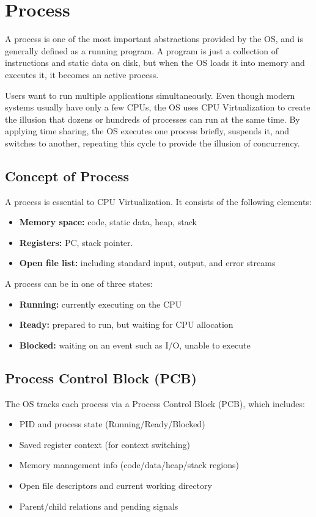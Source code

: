 
\section{Process}
A process is one of the most important abstractions provided by the OS,
and is generally defined as a running program.
A program is just a collection of instructions and static data on disk,
but when the OS loads it into memory and executes it,
it becomes an active process.

Users want to run multiple applications simultaneously.
Even though modern systems usually have only a few CPUs,
the OS uses CPU Virtualization to create the illusion
that dozens or hundreds of processes can run at the same time.
By applying time sharing, the OS executes one process briefly, suspends it,
and switches to another, repeating this cycle to provide the illusion of concurrency.

\subsection{Concept of Process}
A process is essential to CPU Virtualization.
It consists of the following elements:
\begin{itemize}
    \item \textbf{Memory space:} code, static data, heap, stack
    \item \textbf{Registers:} PC, stack pointer.
    \item \textbf{Open file list:} including standard input, output, and error streams
\end{itemize}

A process can be in one of three states:
\begin{itemize}
    \item \textbf{Running:} currently executing on the CPU
    \item \textbf{Ready:} prepared to run, but waiting for CPU allocation
    \item \textbf{Blocked:} waiting on an event such as I/O, unable to execute
\end{itemize}

\subsection{Process Control Block (PCB)}
The OS tracks each process via a Process Control Block (PCB), which includes:
\begin{itemize}
    \item PID and process state (Running/Ready/Blocked)
    \item Saved register context (for context switching)
    \item Memory management info (code/data/heap/stack regions)
    \item Open file descriptors and current working directory
    \item Parent/child relations and pending signals
\end{itemize}

